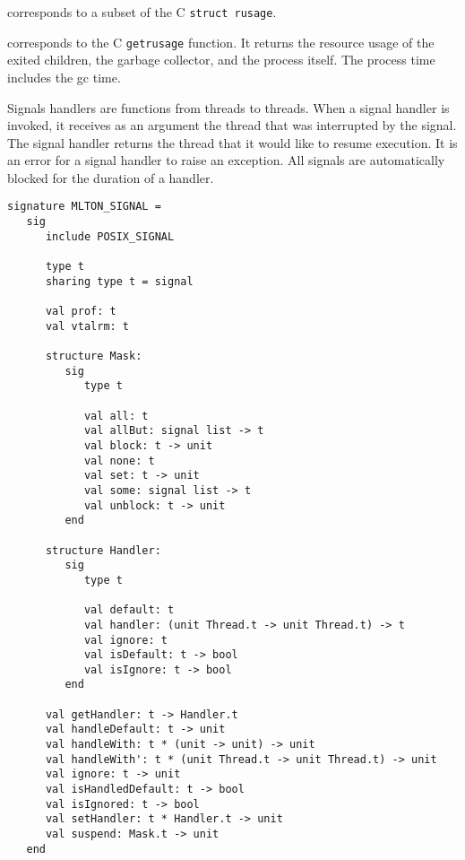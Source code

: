 \begin{description}
corresponds to a subset of the C {\tt struct rusage}.

corresponds to the C {\tt getrusage} function.  It returns the resource usage of
the exited children, the garbage collector, and the process itself.  The process
time includes the gc time.
\end{description}

Signals handlers are functions from threads to threads.  When a signal 
handler is invoked, it receives as an argument the thread that was
interrupted by the signal.  The signal handler returns the thread that 
it would like to resume execution.  It is an error for a signal
handler to raise an exception.  All signals are automatically blocked
for the duration of a handler.

\begin{verbatim}
signature MLTON_SIGNAL =
   sig
      include POSIX_SIGNAL

      type t
      sharing type t = signal

      val prof: t
      val vtalrm: t

      structure Mask:
         sig
            type t
               
            val all: t
            val allBut: signal list -> t
            val block: t -> unit
            val none: t
            val set: t -> unit
            val some: signal list -> t
            val unblock: t -> unit
         end

      structure Handler:
         sig
            type t

            val default: t
            val handler: (unit Thread.t -> unit Thread.t) -> t
            val ignore: t
            val isDefault: t -> bool
            val isIgnore: t -> bool
         end

      val getHandler: t -> Handler.t
      val handleDefault: t -> unit
      val handleWith: t * (unit -> unit) -> unit
      val handleWith': t * (unit Thread.t -> unit Thread.t) -> unit
      val ignore: t -> unit
      val isHandledDefault: t -> bool
      val isIgnored: t -> bool
      val setHandler: t * Handler.t -> unit
      val suspend: Mask.t -> unit
   end
\end{verbatim}

